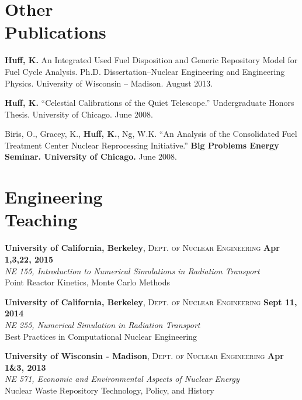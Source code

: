 \documentclass[margin,line]{resume}
\begin{document}
\begin{resume}
    \section{\mysidestyle Other\\Publications}
    \begin{bibenum}
      \item \textbf{Huff, K.} An Integrated Used Fuel Disposition and Generic Repository Model for Fuel Cycle Analysis.
        Ph.D. Dissertation--Nuclear Engineering and Engineering
        Physics. University of Wisconsin -- Madison.  August 2013.
      \item \textbf{Huff, K.} ``Celestial Calibrations of the Quiet Telescope.''
        Undergraduate Honors Thesis. University of Chicago. June 2008.
      \item Biris, O., Gracey, K., \textbf{Huff, K.}, Ng, W.K.
        ``An Analysis of the Consolidated Fuel Treatment Center Nuclear
        Reprocessing Initiative.''
        \textbf{Big Problems Energy Seminar. University of Chicago.} June 2008.
    \end{bibenum}
    \section{\mysidestyle Engineering\\Teaching}

    \textbf{University of California, Berkeley}, \textsc{Dept. of Nuclear Engineering} \hfill \textbf{Apr 1,3,22, 2015}\\
               \textsl{NE 155, Introduction to Numerical Simulations in Radiation Transport}\\
               Point Reactor Kinetics, Monte Carlo Methods 

    \textbf{University of California, Berkeley}, \textsc{Dept. of Nuclear Engineering} \hfill \textbf{Sept 11, 2014}\\
               \textsl{NE 255, Numerical Simulation in Radiation Transport}\\
               Best Practices in Computational Nuclear Engineering

    \textbf{University of Wisconsin - Madison}, \textsc{Dept. of Nuclear Engineering} \hfill \textbf{Apr 1\&3, 2013}\\
               \textsl{NE 571, Economic and Environmental Aspects of Nuclear Energy}\\
               Nuclear Waste Repository Technology, Policy, and History


\end{resume}
\end{document}
